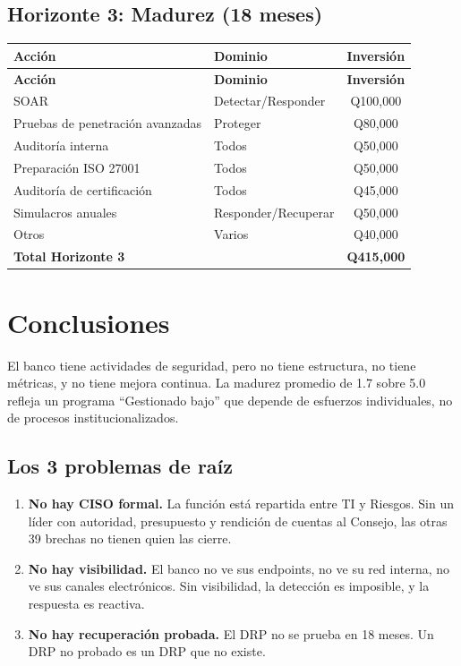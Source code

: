 \documentclass[11pt,a4paper]{article}
\begin{document}
	\subsection{Horizonte 3: Madurez (18 meses)}
	
	\begin{longtable}{@{}p{6cm}p{4cm}c@{}}
		\toprule
		\textbf{Acción} & \textbf{Dominio} & \textbf{Inversión} \\ \midrule
		\endfirsthead
		\toprule
		\textbf{Acción} & \textbf{Dominio} & \textbf{Inversión} \\ \midrule
		\endhead
		SOAR & Detectar/Responder & Q100,000 \\
		Pruebas de penetración avanzadas & Proteger & Q80,000 \\
		Auditoría interna & Todos & Q50,000 \\
		Preparación ISO 27001 & Todos & Q50,000 \\
		Auditoría de certificación & Todos & Q45,000 \\
		Simulacros anuales & Responder/Recuperar & Q50,000 \\
		Otros & Varios & Q40,000 \\ \midrule
		\textbf{Total Horizonte 3} & & \textbf{Q415,000} \\ \bottomrule
	\end{longtable}
	
	\newpage
	
	
	\section{Conclusiones}
	
	\begin{okbox}
		El banco tiene actividades de seguridad, pero no tiene estructura, no tiene métricas, y no tiene mejora continua. La madurez promedio de 1.7 sobre 5.0 refleja un programa ``Gestionado bajo'' que depende de esfuerzos individuales, no de procesos institucionalizados.
	\end{okbox}
	
	\subsection{Los 3 problemas de raíz}
	
	\begin{enumerate}[leftmargin=1.5em]
		\item \textbf{No hay CISO formal.} La función está repartida entre TI y Riesgos. Sin un líder con autoridad, presupuesto y rendición de cuentas al Consejo, las otras 39 brechas no tienen quien las cierre.
		\item \textbf{No hay visibilidad.} El banco no ve sus endpoints, no ve su red interna, no ve sus canales electrónicos. Sin visibilidad, la detección es imposible, y la respuesta es reactiva.
		\item \textbf{No hay recuperación probada.} El DRP no se prueba en 18 meses. Un DRP no probado es un DRP que no existe.
	\end{enumerate}
	
\end{document}
